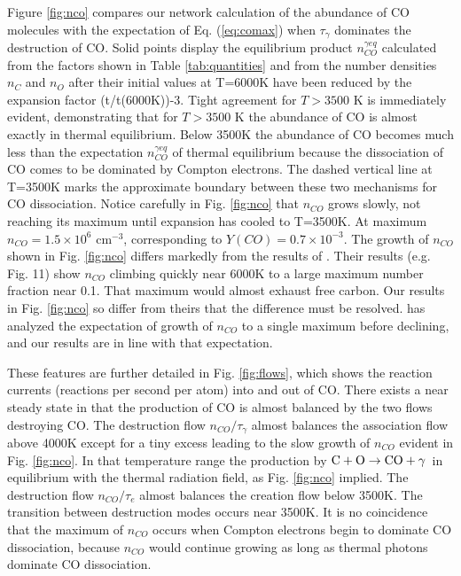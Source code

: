 \documentclass[manuscript]{aastex}
\newcommand{\cotoco}{${\rm C} + {\rm O} \to {\rm CO} + \gamma$}
\newcommand{\ncogeq}{n_{CO}^{\gamma eq}}
\begin{document}
Figure \ref{fig:nco}
compares our network calculation of the abundance of CO molecules
with the expectation of Eq. (\ref{eq:comax}) when $\tau_\gamma$
dominates the destruction of CO.
Solid points display the equilibrium product $\ncogeq$ calculated from the
factors shown in Table \ref{tab:quantities}
and from the number densities $n_C$ and $n_O$ after
their initial values at T=6000K have been reduced by the expansion factor
(t/t(6000K))-3. Tight agreement for $T > 3500$ K is immediately evident,
demonstrating that for $T > 3500$ K the abundance of CO is almost exactly in
thermal equilibrium. Below 3500K the abundance of CO becomes much less than
the expectation $\ncogeq$ of thermal equilibrium because the dissociation of CO
comes to be dominated by Compton electrons. The dashed vertical line at
T=3500K marks the approximate boundary between these two mechanisms for CO
dissociation. Notice carefully in Fig. \ref{fig:nco}
that $n_{CO}$ grows slowly, not reaching
its maximum until expansion has cooled to T=3500K.
At maximum $n_{CO} = 1.5 \times 10^6$ cm$^{-3}$,
corresponding to $Y(CO) = 0.7 \times 10^{-3}$. The growth of $n_{CO}$
shown in Fig. \ref{fig:nco} differs markedly from the results of
\citet{2009ApJ...703..642C}.
Their results (e.g. Fig. 11) show $n_{CO}$ climbing quickly near 6000K to a large
maximum number fraction near 0.1. That maximum would almost exhaust free
carbon. Our results in Fig. \ref{fig:nco}
so differ from theirs that the difference
must be resolved. \citet{2013ApJ...762....5C} has analyzed the expectation
of growth of $n_{CO}$ to a single maximum before declining, and our results are
in line with that expectation. 

These features are further detailed in Fig. \ref{fig:flows},
which shows the reaction
currents (reactions per second per atom) into and out of CO. There exists a
near steady state in that the production of CO is almost balanced by the
two flows destroying CO. The destruction flow $n_{CO}/\tau_\gamma$
almost balances the
association flow above 4000K except for a tiny excess leading to the
slow growth of $n_{CO}$ evident in Fig. \ref{fig:nco}. In that temperature range the
production by \cotoco\ in equilibrium with the thermal radiation field,
as Fig. \ref{fig:nco} implied. The destruction flow $n_{CO}/\tau_e$
almost balances the
creation flow below 3500K. The transition between destruction modes occurs
near 3500K. It is no coincidence that the maximum of $n_{CO}$ occurs when
Compton electrons begin to dominate CO dissociation, because $n_{CO}$ would
continue growing as long as thermal photons dominate CO dissociation. 
\end{document}
